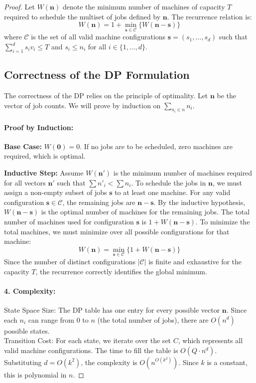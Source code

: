 \begin{proof}
Let $W(\mathbf{n})$ denote the minimum number of machines of capacity $T$ required to schedule the multiset of jobs defined by $\mathbf{n}$. The recurrence relation is:
\[ W(\mathbf{n}) = 1 + \min_{\mathbf{s} \in \mathcal{C}} \{ W(\mathbf{n} - \mathbf{s}) \} \]
where $\mathcal{C}$ is the set of all valid machine configurations $\mathbf{s} = (s_1, \dots, s_d)$ such that $\sum_{i=1}^d s_i v_i \le T$ and $s_i \le n_i$ for all $i \in \{1, \dots, d\}$.

\subsection*{Correctness of the DP Formulation}

The correctness of the DP relies on the principle of optimality. Let $\mathbf{n}$ be the vector of job counts.
We will prove by induction on $\sum_{n_i \in n}{n_i}$.
\paragraph{Proof by Induction:}
\textbf{Base Case:} $W(\mathbf{0}) = 0$. If no jobs are to be scheduled, zero machines are required, which is optimal.

\textbf{Inductive Step:} Assume $W(\mathbf{n}')$ is the minimum number of machines required for all vectors $\mathbf{n}'$ such that $\sum n'_i < \sum n_i$. To schedule the jobs in $\mathbf{n}$, we must assign a non-empty subset of jobs $\mathbf{s}$ to at least one machine. 
For any valid configuration $\mathbf{s} \in \mathcal{C}$, the remaining jobs are $\mathbf{n} - \mathbf{s}$. By the inductive hypothesis, $W(\mathbf{n} - \mathbf{s})$ is the optimal number of machines for the remaining jobs.
The total number of machines used for configuration $\mathbf{s}$ is $1 + W(\mathbf{n} - \mathbf{s})$. 
To minimize the total machines, we must minimize over all possible configurations for that machine:
\[ W(\mathbf{n}) = \min_{\mathbf{s} \in \mathcal{C}} \{ 1 + W(\mathbf{n} - \mathbf{s}) \} \]
Since the number of distinct configurations $|\mathcal{C}|$ is finite and exhaustive for the capacity $T$, the recurrence correctly identifies the global minimum. 


\paragraph{4. Complexity:}
State Space Size: The DP table has one entry for every possible vector $\mathbf{n}$. Since each $n_i$ can range from $0$ to $n$ (the total number of jobs), there are $O(n^d)$ possible states.\\Transition Cost: For each state, we iterate over the set $C$, which represents all valid machine configurations.
The time to fill the table is $O(Q \cdot n^d)$. Substituting $d = O(k^2)$, the complexity is $O(n^{O(k^2)})$. Since $k$ is a constant, this is polynomial in $n$.
\end{proof}

